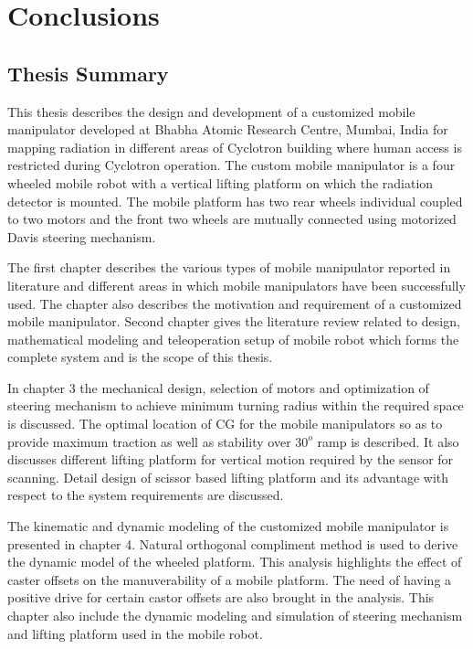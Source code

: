 \chapter{Conclusions}
\label{ch_8:Con}
\section{Thesis Summary}
This thesis describes the design and development of a customized mobile manipulator developed at Bhabha Atomic Research Centre, Mumbai, India  for mapping radiation in different areas of Cyclotron building where human access is restricted during Cyclotron operation. The custom mobile manipulator is a four wheeled mobile robot with a vertical lifting platform on which the radiation detector is mounted. The mobile platform has two rear wheels individual coupled to   two motors and the front two wheels are mutually connected using motorized Davis steering mechanism.

   The first chapter describes the various types of mobile manipulator reported in literature and different areas in which mobile manipulators have been successfully used. The chapter also describes the motivation and requirement of a customized mobile manipulator.  Second chapter gives the literature review related to design, mathematical modeling and teleoperation setup of mobile robot which forms the complete system and is  the scope of this thesis. 

In chapter 3 the mechanical design, selection of motors and optimization  of steering mechanism to achieve minimum turning radius within the required space is discussed. The optimal location of CG for  the mobile manipulators so as to provide maximum traction as well as  stability over $30^o$ ramp is described.   It also discusses different lifting platform for vertical motion required by the sensor for scanning. Detail design  of scissor based lifting platform and its advantage with respect to the system requirements are discussed. 

The kinematic and dynamic modeling of the customized mobile manipulator is presented in chapter 4.  Natural orthogonal compliment method is used to derive the dynamic model of the wheeled platform. This analysis highlights the  effect of caster  offsets on the manuverability of a mobile platform. The need of having a positive drive for certain castor offsets are also brought in the analysis. This chapter also include the dynamic modeling and simulation of steering mechanism  and lifting platform used in the mobile robot.     


